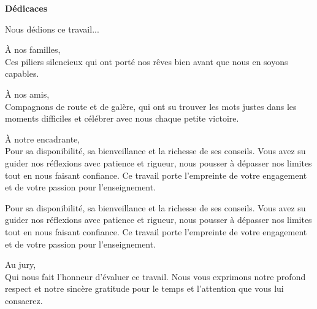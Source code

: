 \documentclass[12pt,a4paper,oneside]{report}
\begin{document}




\clearpage
\thispagestyle{empty}

\vspace*{0.5cm}

\begin{center}
{\bfseries\fontsize{16}{18}\selectfont Dédicaces}
\end{center}

\vspace{0.5cm}

\begin{center}
\itshape

Nous dédions ce travail...

\vspace{0.8cm}

À nos familles,\\
Ces piliers silencieux qui ont porté nos rêves bien avant que nous en soyons capables.

\vspace{0.6cm}

À nos amis,\\
Compagnons de route et de galère, qui ont su trouver les mots justes dans les moments difficiles et célébrer avec nous chaque petite victoire.

\vspace{0.6cm}

À notre encadrante,\\
Pour sa disponibilité, sa bienveillance et la richesse de ses conseils. Vous avez su guider nos réflexions avec patience et rigueur, nous pousser à dépasser nos limites tout en nous faisant confiance. Ce travail porte l'empreinte de votre engagement et de votre passion pour l'enseignement.

\vspace{0.6cm}

Pour sa disponibilité, sa bienveillance et la richesse de ses conseils. Vous avez su guider nos réflexions avec patience et rigueur, nous pousser à dépasser nos limites tout en nous faisant confiance. Ce travail porte l'empreinte de votre engagement et de votre passion pour l'enseignement.

\vspace{0.6cm}

Au jury,\\
Qui nous fait l'honneur d'évaluer ce travail. Nous vous exprimons notre profond respect et notre sincère gratitude pour le temps et l'attention que vous lui consacrez.


\end{center}
\end{document}
